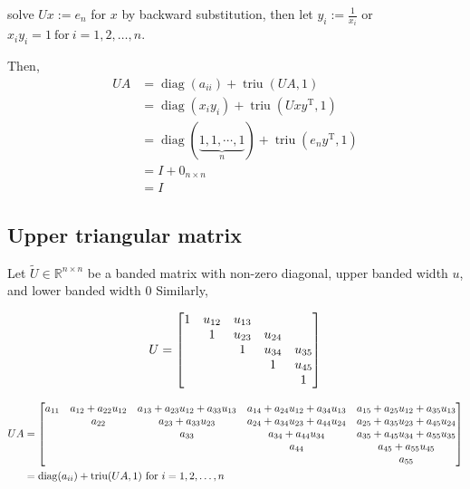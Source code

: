 \documentclass[11pt]{article}
\newcommand{\diag}{\mathop{\mathrm{diag}}}
\newcommand{\triu}{\mathop{\mathrm{triu}}}
\newcommand{\T}{\mathrm{T}}
\begin{document}
\noindent solve $Ux := e_{n}$ for $x$ by backward substitution, then let $y_{i} := \frac{1}{x_{i}}$ or $x_{i} y_{i} = 1\ \text{for} \ i = 1, 2, \ldots , n$.


\noindent Then,
\begin{align*}
    UA &= \diag(a_{ii}) + \triu(UA, 1)\\
    &= \diag(x_{i} y_{i}) + \triu(Uxy^{\T}, 1)\\
    &= \diag(\underbrace{1, 1, \cdots, 1}_n) + \triu(e_{n} y^{\T}, 1)\\
    &= I + 0_{n \times n}\\
    &= I
\end{align*}



\subsection{Upper triangular matrix}

\noindent Let $\tilde{U} \in \mathbb{R}^{n \times n}$ be a banded matrix with non-zero diagonal, upper banded width $u$, and lower banded width $0$ 
\noindent Similarly,

\begin{align*}
    U = \mqty[
        1 & u_{12} & u_{13} &   &  \\
          & 1 & u_{23} & u_{24} &  \\
          &   & 1 & u_{34} & u_{35}\\
          &   &   & 1 & u_{45}\\
          &   &   &   & 1
    ]
\end{align*}

\begin{align*}
    UA &= \mqty[
        a_{11} & a_{12} + a_{22} u_{12} & a_{13} + a_{23} u_{12} + a_{33} u_{13} & a_{14} + a_{24} u_{12} + a_{34} u_{13} & a_{15} + a_{25} u_{12} + a_{35} u_{13}\\
          & a_{22} & a_{23} + a_{33} u_{23} & a_{24} + a_{34} u_{23} + a_{44} u_{24} & a_{25} + a_{35} u_{23} + a_{45} u_{24}\\
          &   & a_{33} & a_{34} + a_{44} u_{34} & a_{35} + a_{45} u_{34} + a_{55} u_{35}\\
          &   &   & a_{44} & a_{45} + a_{55} u_{45}\\
          &   &   &   & a_{55}
    ]\\
    &= \diag(a_{ii}) + \triu(UA, 1)\ \text{for} \ i = 1, 2, \ldots , n
\end{align*}
\end{document}
